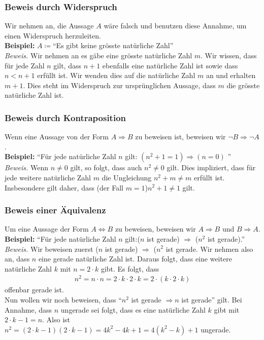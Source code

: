 \subsubsection{Beweis durch Widerspruch}
\begin{minipage}{0.9\linewidth}
Wir nehmen an, die Aussage $A$ wäre falsch und benutzen diese Annahme, um einen Widerspruch herzuleiten.\\ 
\textbf{Beispiel:} $A\coloneqq$``Es gibt keine grösste natürliche Zahl''\\
\textit{Beweis.} Wir nehmen an es gäbe eine grösste natürliche Zahl $m$.
Wir wissen, dass für jede Zahl $n$ gilt, dass $n+1$ ebenfalls eine natürliche Zahl ist sowie dass $n<n+1$ erfüllt ist. Wir wenden dies auf die natürliche Zahl $m$ an und erhalten $m+1$. Dies steht im Widerspruch zur ursprünglichen Aussage, dass $m$ die grösste natürliche Zahl ist.
\end{minipage}

\subsubsection{Beweis durch Kontraposition}
\begin{minipage}{0.9\linewidth}
Wenn eine Aussage von der Form $A \Rightarrow B$ zu beweisen ist, beweisen wir $\neg B \Rightarrow \neg A$. \\
\textbf{Beispiel:} ``Für jede natürliche Zahl $n$ gilt: $(n^2+1=1) \Rightarrow (n=0)$ '' \\
\textit{Beweis.} Wenn $n\neq 0$ gilt, so folgt, dass auch $n^2 \neq 0$ gilt. Dies impliziert, dass für jede weitere natürliche Zahl $m$ die Ungleichung $n^2 + m \neq m$ erfüllt ist. Insbesondere gilt daher, dass (der Fall $m=1$)$n^2+1\neq 1$ gilt.
\end{minipage}

\subsubsection{Beweis einer Äquivalenz}
\begin{minipage}{0.9\linewidth}
Um eine Aussage der Form $A \Leftrightarrow B$ zu beweisen, beweisen wir $A \Rightarrow B$ und $B \Rightarrow A$.\\
\textbf{Beispiel:} ``Für jede natürliche Zahl $n$ gilt:($n$ ist gerade) $\Rightarrow$ ($n^2$ ist gerade).'' \\
\textit{Beweis.} Wir beweisen zuerst ($n$ ist gerade) $\Rightarrow$ ($n^2$ ist gerade. Wir nehmen also an, dass $n$ eine gerade natürliche Zahl ist. Daraus folgt, dass eine weitere natürliche Zahl $k$ mit $n=2\cdot k$ gibt.
Es folgt, dass
\begin{align*}
 n^2 = n\cdot n = 2 \cdot k \cdot 2 \cdot k = 2 \cdot 
 (k \cdot 2 \cdot k)
\end{align*}
offenbar gerade ist. \\
Nun wollen wir noch beweisen, dass ``$n^2$ ist gerade $\Rightarrow n$ ist gerade'' gilt. Bei Annahme, dass $n$ ungerade sei folgt, dass es eine natürliche Zahl $k$ gibt mit $2 \cdot k - 1 = n$. Also ist $n^2 = (2 \cdot k - 1)(2 \cdot k - 1) = 4k^2-4k+1=4(k^2-k)+1$ ungerade.
\end{minipage}

